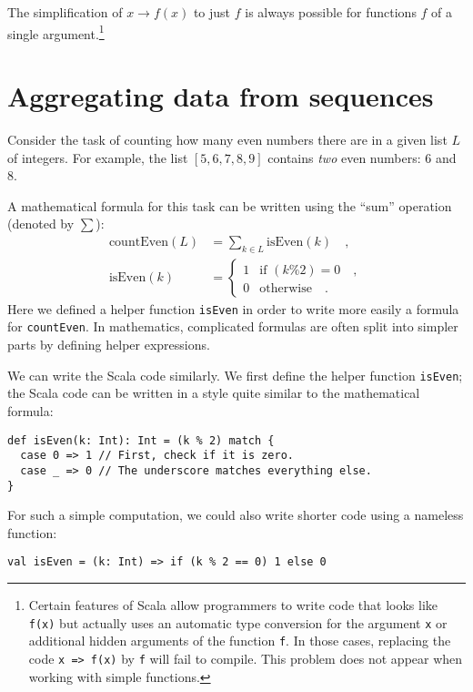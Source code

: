 The simplification of $x\rightarrow f(x)$ to just $f$ is always
possible for functions $f$ of a single argument.\footnote{Certain features of Scala allow programmers to write code that looks
like \lstinline!f(x)! but actually uses an automatic type conversion
for the argument \lstinline!x! or additional hidden arguments of
the function \lstinline!f!. In those cases, replacing the code \lstinline!x => f(x)!
by \lstinline!f! will fail to compile. This problem does not appear
when working with simple functions.}

\section{Aggregating data from sequences}

Consider the task of counting how many even numbers there are in a
given list $L$ of integers. For example, the list $\left[5,6,7,8,9\right]$
contains \emph{two} even numbers: $6$ and $8$.

A mathematical formula for this task can be written using the \textsf{``}sum\textsf{''}
operation (denoted by $\sum$):
\begin{align*}
\text{countEven}\left(L\right) & =\sum_{k\in L}\text{isEven}\left(k\right)\quad,\\
\text{isEven}\left(k\right) & =\begin{cases}
1 & \text{if }(k\%2)=0\quad,\\
0 & \text{otherwise}\quad.
\end{cases}
\end{align*}
Here we defined a helper function \texttt{}\lstinline!isEven! in
order to write more easily a formula for \lstinline!countEven!. In
mathematics, complicated formulas are often split into simpler parts
by defining helper expressions. 

We can write the Scala code similarly. We first define the helper
function \lstinline!isEven!; the Scala code can be written in a style
quite similar to the mathematical formula:

\begin{lstlisting}
def isEven(k: Int): Int = (k % 2) match {
  case 0 => 1 // First, check if it is zero.
  case _ => 0 // The underscore matches everything else.
}
\end{lstlisting}

For such a simple computation, we could also write shorter code using
a nameless function:

\begin{lstlisting}
val isEven = (k: Int) => if (k % 2 == 0) 1 else 0
\end{lstlisting}


